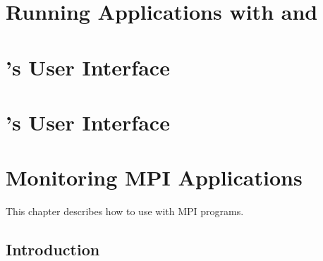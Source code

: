 \documentclass[11pt,letterpaper]{report}
\begin{document}

\chapter{Running Applications with \hpcrun{} and \hpclink{}}
\label{chpt:hpcrun}





\chapter{\hpcviewer{}'s User Interface}
\label{chpt:hpcviewer-interface}





\chapter{\hpctraceviewer{}'s User Interface}
\label{chpt:hpctraceviewer-interface}





\chapter{Monitoring MPI Applications}
\label{chpt:mpi-apps}

This chapter describes how to use \HPCToolkit{} with MPI programs.


\section{Introduction}
\end{document}
